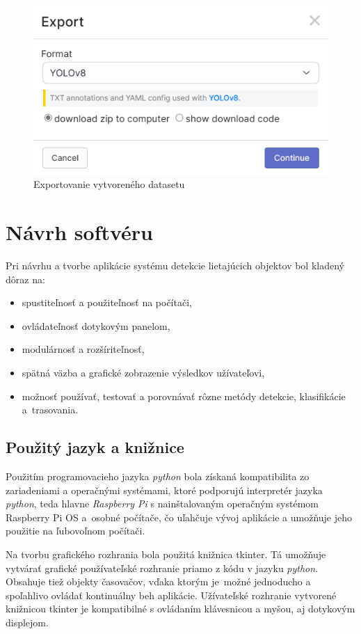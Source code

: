     \begin{figure}[H]
        \centering
        \includegraphics[width=.5\textwidth]{obrazky/roboflow/export.png}
        \caption{Exportovanie vytvoreného datasetu}
    \end{figure}

\chapter{Návrh softvéru}

    Pri návrhu a tvorbe aplikácie systému detekcie lietajúcich objektov bol kladený dôraz na:
    \begin{itemize}
        \item spustiteľnosť a použiteľnosť na počítači,
        \item ovládateľnosť dotykovým panelom,
        \item modulárnosť a rozšíriteľnosť,
        \item spätná väzba a grafické zobrazenie výsledkov užívateľovi,
        \item možnosť používať, testovať a porovnávať rôzne metódy detekcie, klasifikácie a~trasovania.
    \end{itemize}

    \section{Použitý jazyk a knižnice}

        Použitím programovacieho jazyka \emph{python} bola získaná kompatibilita zo zariadeniami a operačnými systémami, ktoré podporujú interpretér jazyka \emph{python}, teda hlavne \emph{Raspberry Pi} s nainštalovaným operačným systémom Raspberry Pi OS a~osobné počítače, čo uľahčuje vývoj aplikácie a umožňuje jeho použitie na ľubovoľnom počítači.

        Na tvorbu grafického rozhrania bola použitá knižnica \ac{tkinter}. Tá umožňuje vytvárať grafické používateľské rozhranie priamo z kódu v jazyku \emph{python}. Obsahuje tiež objekty časovačov, vďaka ktorým je~možné jednoducho a spoľahlivo ovládať kontinuálny beh aplikácie. Užívateľské rozhranie vytvorené knižnicou \ac{tkinter} je kompatibilné s ovládaním klávesnicou a myšou, aj dotykovým displejom.

